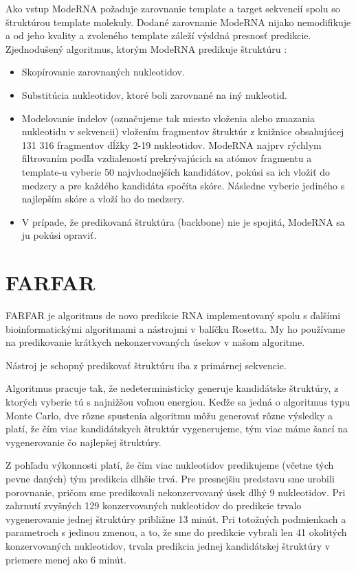 \indent Ako vstup ModeRNA požaduje zarovnanie  template a target sekvencií spolu so štruktúrou template molekuly. Dodané zarovnanie ModeRNA nijako nemodifikuje a od jeho kvality a zvoleného template záleží výsldná presnosť predikcie. 
Zjednodušený algoritmus, ktorým ModeRNA predikuje štruktúru \cite{Rother11}: 

\begin{itemize}
\item Skopírovanie zarovnaných nukleotidov.
\item Substitúcia nukleotidov, ktoré boli zarovnané na iný nukleotid.
\item Modelovanie indelov (označujeme tak miesto vloženia alebo zmazania nukleotidu v sekvencii) vložením fragmentov štruktúr z knižnice obsahujúcej 131 316 fragmentov dĺžky 2-19 nukleotidov. ModeRNA najprv rýchlym filtrovaním podľa vzdialeností  prekrývajúcich sa atómov fragmentu a template-u vyberie 50 najvhodnejších kandidátov, pokúsi sa ich vložiť do medzery a pre každého kandidáta spočíta skóre. Následne vyberie jediného s najlepším skóre a vloží ho do medzery.
\item V prípade, že predikovaná štruktúra (backbone) nie je spojitá, ModeRNA sa ju pokúsi opraviť.
\end{itemize}


\section{FARFAR}

FARFAR je algoritmus de novo predikcie RNA implementovaný spolu s ďalšími bioinformatickými algoritmami a nástrojmi v balíčku Rosetta. My ho používame na predikovanie krátkych nekonzervovaných úsekov v našom algoritme.  


\indent Nástroj je schopný predikovať štruktúru iba z primárnej sekvencie. 


\indent Algoritmus pracuje tak, že nedeterministicky generuje kandidátske štruktúry, z ktorých vyberie tú s najnižšou voľnou energiou. Keďže sa jedná o algoritmus typu Monte Carlo, dve rôzne spustenia algoritmu môžu generovať rôzne výsledky a platí, že čím viac kandidátskych štruktúr vygenerujeme, tým viac máme šancí na vygenerovanie čo najlepšej štruktúry.


\indent Z pohľadu výkonnosti platí, že čím viac nukleotidov predikujeme (včetne tých pevne daných) tým predikcia dlhšie trvá. Pre presnejšiu predstavu sme urobili porovnanie, pričom sme predikovali nekonzervovaný úsek dlhý 9 nukleotidov. Pri zahrnutí zvyšných 129 konzervovaných nukleotidov do predikcie trvalo vygenerovanie jednej štruktúry približne 13 minút. Pri totožných podmienkach a parametroch s jedinou zmenou, a to, že sme do predikcie vybrali len 41 okolitých konzervovaných nukleotidov, trvala predikcia jednej kandidátskej štruktúry v priemere menej ako 6 minút.


